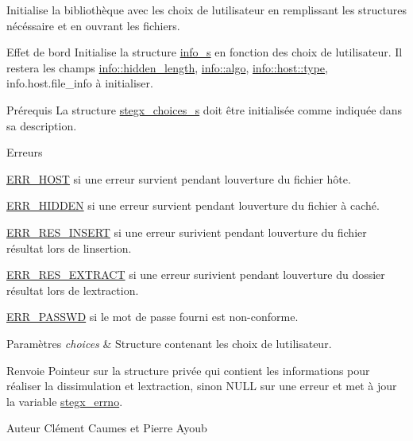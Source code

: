 Initialise la bibliothèque avec les choix de l\textquotesingle{}utilisateur en remplissant les structures nécéssaire et en ouvrant les fichiers. \begin{DoxyParagraph}{Effet de bord}
Initialise la structure \hyperlink{a00008_aa8ca908d92fb5bdd3c0a9e1f58b2cf03}{info\+\_\+s} en fonction des choix de l\textquotesingle{}utilisateur. Il restera les champs \hyperlink{a00154_a5faadf710cbff5ed6e2882e78216084c}{info\+::hidden\+\_\+length}, \hyperlink{a00154_aa6ad0a3fe5b1489edc6684da68c3b588}{info\+::algo}, \hyperlink{a00047_a7aead736a07eaf25623ad7bfa1f0ee2d}{info\+::host\+::type}, info.\+host.\+file\+\_\+info à initialiser. 
\end{DoxyParagraph}
\begin{DoxyParagraph}{Prérequis}
La structure \hyperlink{a00008_ae5a2888ba8550edd4b6da33702b83a9d}{stegx\+\_\+choices\+\_\+s} doit être initialisée comme indiquée dans sa description. 
\end{DoxyParagraph}
\begin{DoxyRefDesc}{Erreurs}
\item[\hyperlink{a00134__errors000001}{Erreurs}]\hyperlink{a00011_a08b18ac8af0f3462354240d9732f3852a49b4659ab34e5808bae4b43669ae5689}{E\+R\+R\+\_\+\+H\+O\+ST} si une erreur survient pendant l\textquotesingle{}ouverture du fichier hôte. 

\hyperlink{a00011_a08b18ac8af0f3462354240d9732f3852af09332ce4e53766f2a7c538727b1f672}{E\+R\+R\+\_\+\+H\+I\+D\+D\+EN} si une erreur survient pendant l\textquotesingle{}ouverture du fichier à caché. 

\hyperlink{a00011_a08b18ac8af0f3462354240d9732f3852a7a60287832ac640af50a1e4d0bb5a7bf}{E\+R\+R\+\_\+\+R\+E\+S\+\_\+\+I\+N\+S\+E\+RT} si une erreur surivient pendant l\textquotesingle{}ouverture du fichier résultat lors de l\textquotesingle{}insertion. 

\hyperlink{a00011_a08b18ac8af0f3462354240d9732f3852ae9b69ff89121ced90b1ad58869cfbf6c}{E\+R\+R\+\_\+\+R\+E\+S\+\_\+\+E\+X\+T\+R\+A\+CT} si une erreur surivient pendant l\textquotesingle{}ouverture du dossier résultat lors de l\textquotesingle{}extraction. 

\hyperlink{a00011_a08b18ac8af0f3462354240d9732f3852a4d17c66e1810646c6f6fef5e30f8904e}{E\+R\+R\+\_\+\+P\+A\+S\+S\+WD} si le mot de passe fourni est non-\/conforme. \end{DoxyRefDesc}

\begin{DoxyParams}{Paramètres}
{\em choices} & Structure contenant les choix de l\textquotesingle{}utilisateur. \\
\hline
\end{DoxyParams}
\begin{DoxyReturn}{Renvoie}
Pointeur sur la structure privée qui contient les informations pour réaliser la dissimulation et l\textquotesingle{}extraction, sinon N\+U\+LL sur une erreur et met à jour la variable \hyperlink{a00062_a5ec48ccdfbe19fe23855818f8556abec}{stegx\+\_\+errno}. 
\end{DoxyReturn}
\begin{DoxyAuthor}{Auteur}
Clément Caumes et Pierre Ayoub 
\end{DoxyAuthor}


